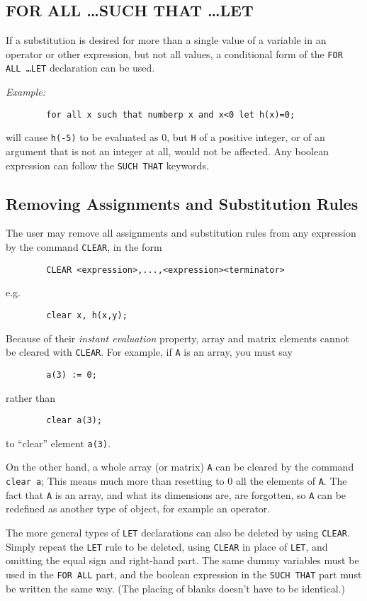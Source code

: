 \subsection{FOR ALL \ldots SUCH THAT \ldots LET}

If a substitution is desired for more than a single value of a variable in
an operator or other expression, but not all values, a conditional form of
the {\tt FOR ALL \ldots LET} declaration can be used.

{\it Example:}
\begin{verbatim}
        for all x such that numberp x and x<0 let h(x)=0;
\end{verbatim}
will cause {\tt h(-5)} to be evaluated as 0, but {\tt H} of a positive
integer, or of an argument that is not an integer at all, would not be
affected.  Any boolean expression can follow the {\tt SUCH THAT} keywords.

\subsection{Removing Assignments and Substitution Rules}

The user may remove all assignments and substitution rules from any
expression by the command {\tt CLEAR}, in the form
\begin{verbatim}
        CLEAR <expression>,...,<expression><terminator>
\end{verbatim}
e.g.
\begin{verbatim}
        clear x, h(x,y);
\end{verbatim}
Because of their {\em instant evaluation\/} property, array and matrix elements
cannot be cleared with {\tt CLEAR}.  For example, if {\tt A} is an array,
you must say
\begin{verbatim}
        a(3) := 0;
\end{verbatim}
rather than
\begin{verbatim}
        clear a(3);
\end{verbatim}
to ``clear'' element {\tt a(3)}.

On the other hand, a whole array (or matrix) {\tt A} can be cleared by the
command {\tt clear a};  This means much more than resetting to 0 all the
elements of {\tt A}.  The fact that {\tt A} is an array, and what its
dimensions are, are forgotten, so {\tt A} can be redefined as another type
of object, for example an operator.

The more general types of {\tt LET} declarations can also be deleted by
using {\tt CLEAR}.  Simply repeat the {\tt LET} rule to be deleted, using
{\tt CLEAR} in place of {\tt LET}, and omitting the equal sign and
right-hand part.  The same dummy variables must be used in the {\tt FOR
ALL} part, and the boolean expression in the {\tt SUCH THAT} part must be
written the same way. (The placing of blanks doesn't have to be
identical.)


